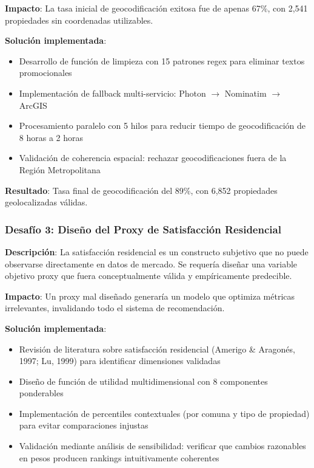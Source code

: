 \textbf{Impacto}: La tasa inicial de geocodificación exitosa fue de apenas 67\%, con 2,541 propiedades sin coordenadas utilizables.

\textbf{Solución implementada}:
\begin{itemize}
    \item Desarrollo de función de limpieza con 15 patrones regex para eliminar textos promocionales
    \item Implementación de fallback multi-servicio: Photon $\rightarrow$ Nominatim $\rightarrow$ ArcGIS
    \item Procesamiento paralelo con 5 hilos para reducir tiempo de geocodificación de 8 horas a 2 horas
    \item Validación de coherencia espacial: rechazar geocodificaciones fuera de la Región Metropolitana
\end{itemize}

\textbf{Resultado}: Tasa final de geocodificación del 89\%, con 6,852 propiedades geolocalizadas válidas.

\subsubsection{Desafío 3: Diseño del Proxy de Satisfacción Residencial}

\textbf{Descripción}: La satisfacción residencial es un constructo subjetivo que no puede observarse directamente en datos de mercado. Se requería diseñar una variable objetivo proxy que fuera conceptualmente válida y empíricamente predecible.

\textbf{Impacto}: Un proxy mal diseñado generaría un modelo que optimiza métricas irrelevantes, invalidando todo el sistema de recomendación.

\textbf{Solución implementada}:
\begin{itemize}
    \item Revisión de literatura sobre satisfacción residencial (Amerigo \& Aragonés, 1997; Lu, 1999) para identificar dimensiones validadas
    \item Diseño de función de utilidad multidimensional con 8 componentes ponderables
    \item Implementación de percentiles contextuales (por comuna y tipo de propiedad) para evitar comparaciones injustas
    \item Validación mediante análisis de sensibilidad: verificar que cambios razonables en pesos producen rankings intuitivamente coherentes
\end{itemize}

